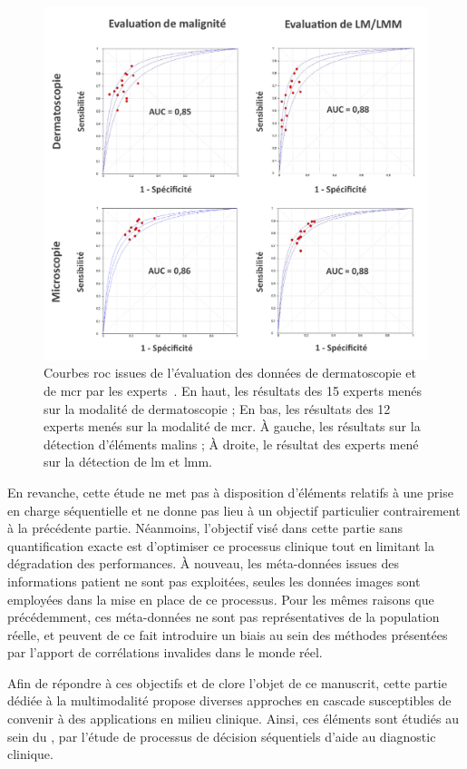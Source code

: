 \begin{figure}[H]
    \begin{center}
        \includegraphics[width=\linewidth]{contents/iii_preamble_multimodal/resources/results_roc_experts.pdf}
        \caption{Courbes \gls{roc} issues de l'évaluation des données de dermatoscopie et de \gls{mcr} par les experts~\cite{Cinotti2018}. En haut, les résultats des 15 experts menés sur la modalité de dermatoscopie ; En bas, les résultats des 12 experts menés sur la modalité de \gls{mcr}. À gauche, les résultats sur la détection d'éléments malins ; À droite, le résultat des experts mené sur la détection de \gls{lm} et \gls{lmm}.}
        \label{fig:results_roc_experts}
    \end{center} 
\end{figure}\par

En revanche, cette étude ne met pas à disposition d'éléments relatifs à une prise en charge séquentielle et ne donne pas lieu à un objectif particulier contrairement à la précédente partie. Néanmoins, l'objectif visé dans cette partie sans quantification exacte est d'optimiser ce processus clinique tout en limitant la dégradation des performances. À nouveau, les méta-données issues des informations patient ne sont pas exploitées, seules les données images sont employées dans la mise en place de ce processus. Pour les mêmes raisons que précédemment, ces méta-données ne sont pas représentatives de la population réelle, et peuvent de ce fait introduire un biais au sein des méthodes présentées par l'apport de corrélations invalides dans le monde réel.\par

Afin de répondre à ces objectifs et de clore l'objet de ce manuscrit, cette partie dédiée à la multimodalité propose diverses approches en cascade susceptibles de convenir à des applications en milieu clinique. Ainsi, ces éléments sont étudiés au sein du , par l'étude de processus de décision séquentiels d'aide au diagnostic clinique.\par
